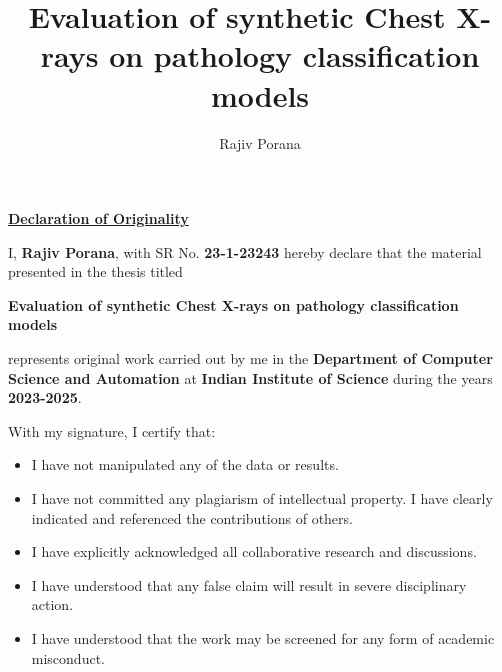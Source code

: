 \documentclass[oneside, 12pt]{IIScthesisPSnPDF}
\begin{document}
	\title{Evaluation of synthetic Chest X-rays on pathology classification
	models}

	\submitdate{\monthyeardate\today} \mtech
	 
	\author{Rajiv Porana}


	\maketitle

	\begin{center}
		\LARGE{\underline{\textbf{Declaration of Originality}}}
	\end{center}
	\noindent
	I, \textbf{Rajiv Porana}, with SR No. \textbf{23-1-23243} hereby declare
	that the material presented in the thesis titled

	\begin{center}
		\textbf{Evaluation of synthetic Chest X-rays on pathology classification
		models}
	\end{center}

	\noindent
	represents original work carried out by me in the \textbf{Department of
	Computer Science and Automation} at \textbf{Indian Institute of Science}
	during the years \textbf{2023-2025}.

	\noindent
	With my signature, I certify that:
	\begin{itemize}
		\item I have not manipulated any of the data or results.

		\item I have not committed any plagiarism of intellectual property. I
			have clearly indicated and referenced the contributions of others.

		\item I have explicitly acknowledged all collaborative research and discussions.

		\item I have understood that any false claim will result in severe disciplinary
			action.

		\item I have understood that the work may be screened for any form of academic
			misconduct.
	\end{itemize}
\end{document}
